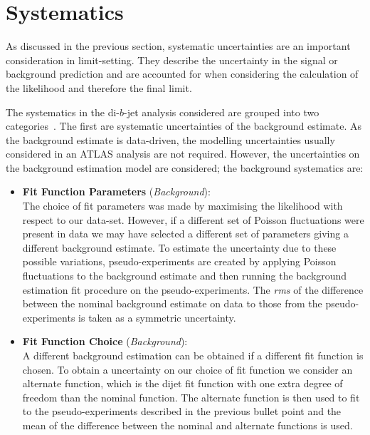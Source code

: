 \section{Systematics}
\label{sec:lim-syst}

As discussed in the previous section,
systematic uncertainties are an important consideration in limit-setting.
They describe the uncertainty in the signal or background prediction and are accounted for
when considering the calculation of the likelihood and therefore the final limit.

The systematics in the di-$b$-jet analysis considered are grouped into two categories~\cite{dibjet-ichep_conf}.
The first are systematic uncertainties of the background estimate.
As the background estimate is data-driven,
the modelling uncertainties usually considered in an ATLAS analysis are not required.
However, the uncertainties on the background estimation model are considered;
the background systematics are:

\begin{itemize}[leftmargin=*]
\item \textbf{Fit Function Parameters} \hspace{1mm} (\textit{Background}):\\
  The choice of fit parameters was made by maximising the likelihood with respect to our data-set.
  However, if a different set of Poisson fluctuations were present in data we may have selected a different
  set of parameters giving a different background estimate.
  To estimate the uncertainty due to these possible variations, pseudo-experiments are created by applying Poisson
  fluctuations to the background estimate and then running the background estimation fit procedure on the pseudo-experiments.
  The \textit{rms} of the difference between the nominal background estimate on data to those from the pseudo-experiments is
  taken as a symmetric uncertainty. \vspace{0.5em}
\item\textbf{Fit Function Choice}  \hspace{1mm} (\textit{Background}):\\
  A different background estimation can be obtained if a different fit function is chosen.
  To obtain a uncertainty on our choice of fit function we consider an alternate function,
  which is the dijet fit function with one extra degree of freedom than the nominal function.
  The alternate function is then used to fit to the pseudo-experiments described in the previous bullet point
  and the mean of the difference between the nominal and alternate functions is used.
  \vspace{0.5em}
\end{itemize}

